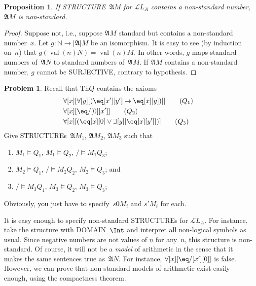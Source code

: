 \documentclass[10pt,a4paper]{article}
\newcommand*{\olup}[1]{\MakeUppercase{#1}}
\theoremstyle{plain}
\newtheorem{prop}[thm]{Proposition}
\theoremstyle{definition}
\newtheorem{prob}{Problem}[section]
\theoremstyle{remark}
\newenvironment{explain}{}{}
\providecommand{\lif}{\mathbin{\rightarrow}}
\providecommand{\lforall}{\mathord{\forall}}
\providecommand{\lexists}{\mathord{\exists}}
\providecommand{\Obj}{}
\providecommand{\Struct}{\ensuremath{\mathfrak{A}}}
\providecommand{\Domain}{\ensuremath{|\mathfrak{A}|}}
\providecommand{\Assign}{\ensuremath{s}}
\providecommand{\Sat}[2]{\ensuremath{#1 \models #2}}
\providecommand{\Lang}{\ensuremath{\mathcal{L}}}
\providecommand{\Th}{\ensuremath{\mathrm{Th}}}
\providecommand{\num}[1]{\underline{#1}}
\providecommand{\Nat}{\ensuremath{\mathbb{N}}}
\providecommand{\Value}[1]{\operatorname{val}(#1)}
\begin{document}
\begin{prop}
If \olup{structure}~$\Struct{M}$ for $\Lang{L_A}$ contains a
non-standard number, $\Struct{M}$ is non-standard.
\end{prop}

\begin{proof}
Suppose not, i.e., suppose $\Struct{M}$ standard but contains a
non-standard number~$x$. Let $g\colon \Nat \to \Domain{M}$ be an
isomorphism. It is easy to see (by induction on~$n$) that
$g(\Value{\num{n}}{N}) = \Value{\num{n}}{M}$. In other words, $g$ maps
standard numbers of~$\Struct{N}$ to standard numbers
of~$\Struct{M}$. If $\Struct{M}$ contains a non-standard number, $g$
cannot be \olup{surjective}, contrary to hypothesis.
\end{proof}

\begin{prob}
Recall that $\Th{Q}$ contains the axioms
\begin{align*}
& \lforall[x][\lforall[y][(\eq[x'][y'] \lif \eq[x][y])]] \tag{$Q_1$}\\
& \lforall[x][\eq/[\Obj 0][x']] \tag{$Q_2$}\\
& \lforall[x][(\eq[x][\Obj 0] \lor \lexists[y][\eq[x][y']])] \tag{$Q_3$}
\end{align*}
Give \olup{structure}s~$\Struct{M_1}$, $\Struct{M_2}$, $\Struct{M_3}$ such that
\begin{enumerate}
\item $\Sat{M_1}{Q_1}$, $\Sat{M_1}{Q_2}$, $\Sat/{M_1}{Q_3}$;
\item $\Sat{M_2}{Q_1}$, $\Sat/{M_2}{Q_2}$, $\Sat{M_2}{Q_3}$; and
\item $\Sat/{M_3}{Q_1}$, $\Sat{M_3}{Q_2}$, $\Sat{M_3}{Q_3}$;
\end{enumerate}
Obviously, you just have to specify~$\Assign{\Obj{0}}{M_i}$ and
$\Assign{\prime}{M_i}$ for each.
\end{prob}

\begin{explain}
It is easy enough to specify non-standard \olup{structure}s for
$\Lang{L_A}$. For instance, take the structure with \olup{domain}~$\Int$
and interpret all non-logical symbols as usual. Since negative numbers
are not values of $\num{n}$ for any~$n$, this structure is
non-standard. Of course, it will not be a \emph{model} of arithmetic
in the sense that it makes the same sentences true
as~$\Struct{N}$. For instance, $\lforall[x][\eq/[x'][\Obj{0}]]$ is
false.  However, we can prove that non-standard models of arithmetic
exist easily enough, using the compactness theorem.
\end{explain}
\end{document}
